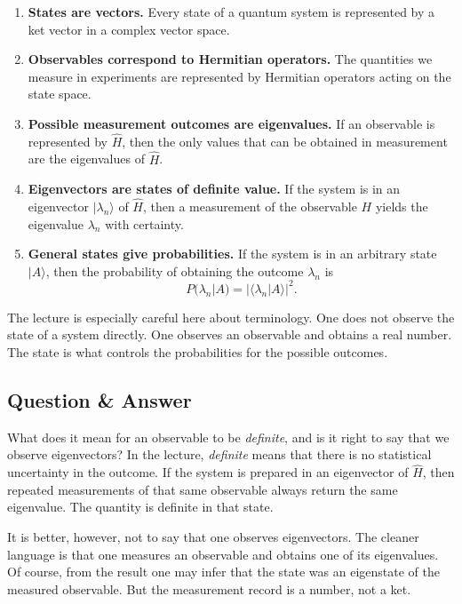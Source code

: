 \begin{enumerate}
\item \textbf{States are vectors.} Every state of a quantum system is represented by a ket vector in a complex vector space.

\item \textbf{Observables correspond to Hermitian operators.} The quantities we measure in experiments are represented by Hermitian operators acting on the state space.

\item \textbf{Possible measurement outcomes are eigenvalues.} If an observable is represented by \(\hat H\), then the only values that can be obtained in measurement are the eigenvalues of \(\hat H\).

\item \textbf{Eigenvectors are states of definite value.} If the system is in an eigenvector \(|\lambda_n\rangle\) of \(\hat H\), then a measurement of the observable \(H\) yields the eigenvalue \(\lambda_n\) with certainty.

\item \textbf{General states give probabilities.} If the system is in an arbitrary state \(|A\rangle\), then the probability of obtaining the outcome \(\lambda_n\) is
\begin{equation}
P(\lambda_n|A)=|\langle \lambda_n|A\rangle|^2.
\end{equation}
\end{enumerate}

The lecture is especially careful here about terminology. One does not observe the state of a system directly. One observes an observable and obtains a real number. The state is what controls the probabilities for the possible outcomes.

\subsection{Question \& Answer}

What does it mean for an observable to be \emph{definite}, and is it right to say that we observe eigenvectors? In the lecture, \emph{definite} means that there is no statistical uncertainty in the outcome. If the system is prepared in an eigenvector of \(\hat H\), then repeated measurements of that same observable always return the same eigenvalue. The quantity is definite in that state.

It is better, however, not to say that one observes eigenvectors. The cleaner language is that one measures an observable and obtains one of its eigenvalues. Of course, from the result one may infer that the state was an eigenstate of the measured observable. But the measurement record is a number, not a ket.

